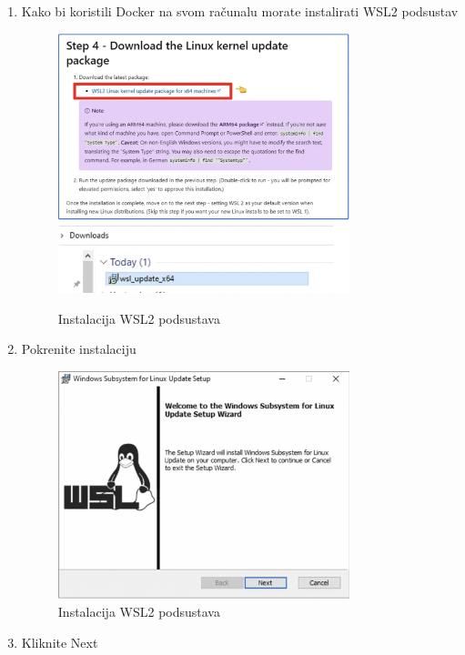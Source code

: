 \begin{enumerate}
\begin{figure}[h]
			\end{figure}
			\item Kako bi koristili Docker na svom računalu morate instalirati WSL2 podsustav
			\begin{figure}[h]
				\centering
				\includegraphics[width=0.8\textwidth]{slike/docker_install/6.png}
				\includegraphics[width=0.8\textwidth]{slike/docker_install/7.png}
				\caption{Instalacija WSL2 podsustava}
			\end{figure}
			\item Pokrenite instalaciju
			\begin{figure}[h]
				\centering
				\includegraphics[width=0.8\textwidth]{slike/docker_install/8.png}
				\caption{Instalacija WSL2 podsustava}
			\end{figure}
			\item Kliknite Next 

\end{enumerate}
